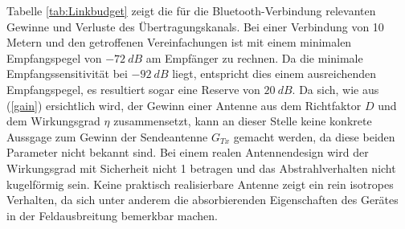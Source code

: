 Tabelle \ref{tab:Linkbudget} zeigt die für die Bluetooth-Verbindung relevanten Gewinne und Verluste des Übertragungskanals. Bei einer Verbindung von 10 Metern und den getroffenen Vereinfachungen ist mit einem minimalen Empfangspegel von $-72\ dB$ am Empfänger zu rechnen. Da die minimale Empfangssensitivität bei $-92\ dB$ liegt, entspricht dies einem ausreichenden Empfangspegel, es resultiert sogar eine Reserve von $20\ dB$. Da sich, wie aus (\ref{gain}) ersichtlich wird, der Gewinn einer Antenne aus dem Richtfaktor $D$ und dem Wirkungsgrad $\eta$ zusammensetzt, kann an dieser Stelle keine konkrete Aussgage zum Gewinn der Sendeantenne $G_{Tx}$ gemacht werden, da diese beiden Parameter nicht bekannt sind. Bei einem realen Antennendesign wird der Wirkungsgrad mit Sicherheit nicht 1 betragen und das Abstrahlverhalten nicht kugelförmig sein. Keine praktisch realisierbare Antenne zeigt ein rein isotropes Verhalten, da sich unter anderem die absorbierenden Eigenschaften des  Gerätes in der Feldausbreitung bemerkbar machen. 


